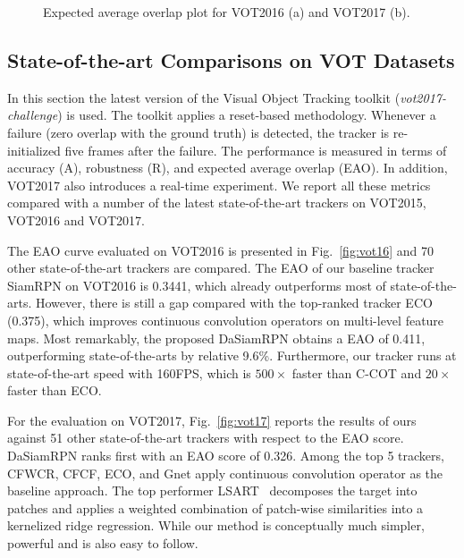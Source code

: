 \documentclass[runningheads]{llncs}
\begin{document}
\begin{figure}[t]
\centering
{}
\caption{Expected average overlap plot for VOT2016 (a) and VOT2017 (b).}
\label{fig_vot}

\end{figure}


\subsection{State-of-the-art Comparisons on VOT Datasets}

\label{sect:vot}

In this section the latest version of the Visual Object Tracking toolkit (\emph{vot2017-challenge}) is used. The toolkit applies a reset-based methodology. Whenever a failure (zero overlap with the ground truth) is detected, the tracker is re-initialized five frames after the failure. The performance is measured in terms of accuracy (A), robustness (R), and expected average overlap (EAO). In addition, VOT2017 also introduces a real-time experiment. We report all these metrics compared with a number of the latest state-of-the-art trackers on VOT2015, VOT2016 and VOT2017.

The EAO curve evaluated on VOT2016 is presented in Fig.~\ref{fig:vot16} and 70 other state-of-the-art trackers are compared. The EAO of our baseline tracker SiamRPN on VOT2016 is 0.3441, which already outperforms most of state-of-the-arts. However, there is still a gap compared with the top-ranked tracker ECO (0.375), which improves continuous convolution operators on multi-level feature maps. Most remarkably, the proposed DaSiamRPN obtains a EAO of 0.411, outperforming state-of-the-arts by relative 9.6\%. Furthermore, our tracker runs at state-of-the-art speed with 160FPS, which is $500\times$ faster than C-COT and $20\times$ faster than ECO.

For the evaluation on VOT2017, Fig.~\ref{fig:vot17} reports the results of ours against 51 other state-of-the-art trackers with respect to the EAO score. DaSiamRPN ranks first with an EAO score of 0.326. Among the top 5 trackers, CFWCR, CFCF, ECO, and Gnet apply continuous convolution operator as the baseline approach. The top performer LSART~\cite{LSART} decomposes the target into patches and applies a weighted combination of patch-wise similarities into a kernelized ridge regression. While our method is conceptually much simpler, powerful and is also easy to follow.
\end{document}
